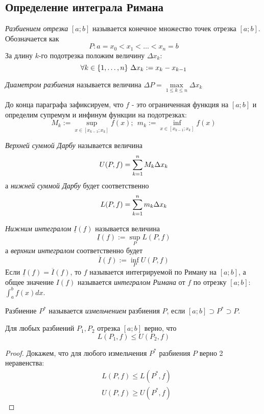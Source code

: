 \subsection{Определение интеграла Римана}


\begin{definition}
	\textit{Разбиением отрезка} $[a; b]$ называется конечное множество точек отрезка $[a; b]$. Обозначается как
	\[
		P: a = x_0 < x_1 < \ldots < x_n = b
	\]
	За длину $k$-го подотрезка положим величину $\Delta x_k$:
	\[
		\forall k \in \{1, \ldots, n\}\ \Delta x_k := x_k - x_{k - 1}
	\]
\end{definition}

\begin{definition}
	\textit{Диаметром разбиения} называется величина $\Delta P = \max\limits_{1 \le k \le n} \Delta x_k$
\end{definition}

\begin{note}
	До конца параграфа зафиксируем, что $f$ - это ограниченная функция на $[a; b]$ и определим супремум и инфинум функции на подотрезках:
	\[
		M_k := \sup\limits_{x \in [x_{k - 1}; x_k]} f(x);\ \ m_k := \inf\limits_{x \in [x_{k - 1}; x_k]} f(x)
	\]
\end{note}

\begin{definition}
	\textit{Верхней суммой Дарбу} называется величина
	\[
		U(P, f) = \sum\limits_{k = 1}^n M_k \Delta x_k
	\]
	а \textit{нижней суммой Дарбу} будет соответственно
	\[
		L(P, f) = \sum\limits_{k = 1}^n m_k \Delta x_k
	\]
\end{definition}

\begin{definition}
	\textit{Нижним интегралом} $\underline{I}(f)$ называется величина
	\[
		\underline{I}(f) := \sup\limits_{P} L(P, f)
	\]
	а \textit{верхним интегралом} соответственно будет
	\[
		\overline{I}(f) := \inf\limits_{P} U(P, f)
	\]
	Если $\underline{I}(f) = \overline{I}(f)$, то $f$ называется интегрируемой по Риману на $[a; b]$, а общее значение $I(f)$ называется \textit{интегралом Римана} от $f$ по отрезку $[a; b]$: $\int_a^b f(x)dx$.
\end{definition}

\begin{definition}
	Разбиение $P^*$ называется \textit{измельчением} разбиения $P$, если $[a; b] \supset P^* \supset P$.
\end{definition}

\begin{lemma}
	Для любых разбиений $P_1, P_2$ отрезка $[a; b]$ верно, что
	\[
		L(P_1, f) \le U(P_2, f)
	\]
\end{lemma}

\begin{proof}
	Докажем, что для любого измельчения $P^*$ разбиения $P$ верно 2 неравенства:
	\begin{align*}
		&{L(P, f) \le L(P^*, f)}
		\\
		&{U(P, f) \ge U(P^*, f)}
	\end{align*}
\end{proof}